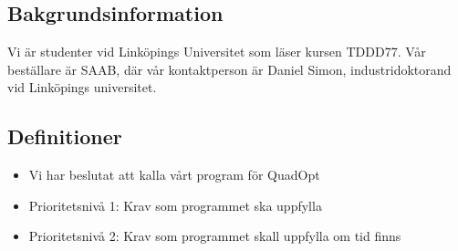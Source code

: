 \subsection{Bakgrundsinformation}
Vi är studenter vid Linköpings Universitet som läser kursen TDDD77. Vår beställare är SAAB, där vår kontaktperson är Daniel Simon, industridoktorand vid Linköpings universitet. 

\subsection{Definitioner}

\begin{itemize}
\item{Vi har beslutat att kalla vårt program för QuadOpt}
\item{Prioritetsnivå 1: Krav som programmet ska uppfylla}
\item{Prioritetsnivå 2: Krav som programmet skall uppfylla om tid finns}
\end{itemize}
